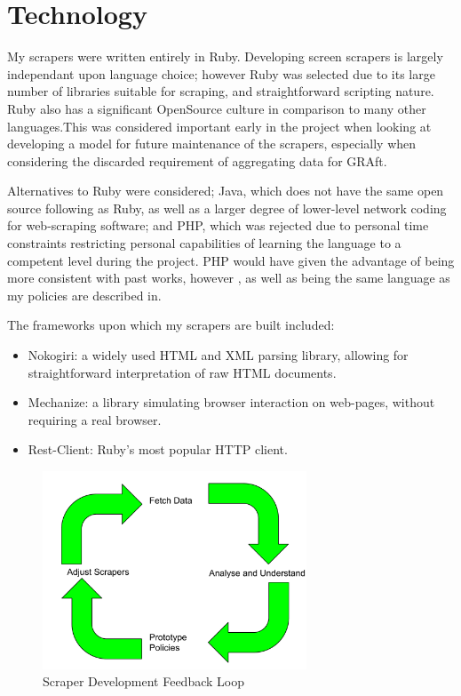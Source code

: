 \section{Technology}

My scrapers were written entirely in Ruby. Developing screen scrapers is largely independant upon language choice; however Ruby was selected due to its large number of libraries suitable for scraping, and straightforward scripting nature. Ruby also has a significant OpenSource culture in comparison to many other languages.This was considered important early in the project when looking at developing a model for future maintenance of the scrapers, especially when considering the discarded requirement of aggregating data for GRAft. 

Alternatives to Ruby were considered; Java, which does not have the same open source following as Ruby, as well as a larger degree of lower-level network coding for web-scraping software; and PHP, which was rejected due to personal time constraints restricting personal capabilities of learning the language to a competent level during the project. PHP would have given the advantage of being more consistent with past works, however \cite{GRAft}, as well as being the same language as my policies are described in. 

The frameworks upon which my scrapers are built included:

\begin{itemize}
 \item Nokogiri: a widely used HTML and XML parsing library, allowing for straightforward interpretation of raw HTML documents.
 \item Mechanize: a library simulating browser interaction on web-pages, without requiring a real browser.
 \item Rest-Client: Ruby's most popular HTTP client.
\end{itemize}

\begin{figure}[h!]
\centering
\includegraphics[width=0.7\textwidth]{Images/Implementation_Lifecycle.pdf}
\caption{Scraper Development Feedback Loop}
\end{figure}



